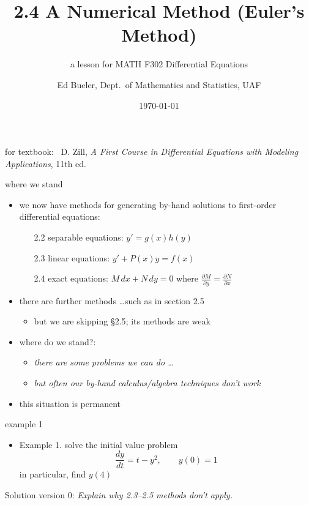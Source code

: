 \documentclass{beamer}
\title{2.4 A Numerical Method (Euler's Method)}
\subtitle{a lesson for MATH F302 Differential Equations}
\author{Ed Bueler, Dept.~of Mathematics and Statistics, UAF}
\date{\tiny \today}
\begin{document}

\begin{frame}
\titlepage

\centerline{\tiny for textbook: \, D. Zill, \emph{A First Course in Differential Equations with Modeling Applications}, 11th ed.}
\end{frame}



\begin{frame}{where we stand}

\begin{itemize}
\item we now have methods for generating by-hand solutions to first-order differential equations:
    \begin{itemize}
    \item[2.2] separable equations: $y'=g(x)h(y)$
    \item[2.3] linear equations: $y'+P(x)y=f(x)$
    \item[2.4] exact equations: $M\,dx + N\,dy=0$ where $\frac{\partial M}{\partial y} = \frac{\partial N}{\partial x}$
    \end{itemize}
\item there are further methods \dots such as in section 2.5
    \begin{itemize}
    \item but \alert{we are skipping \S 2.5}; its methods are weak
    \end{itemize}

\bigskip
\item where do we stand?:
    \begin{itemize}
    \item \emph{there are some problems we can do \dots}
    \item \emph{but often our by-hand calculus/algebra techniques \alert{don't} work}
    \end{itemize}
\item this situation is permanent
\end{itemize}
\end{frame}


\begin{frame}{example 1}

\begin{itemize}
\item Example 1.  solve the initial value problem
    $$\frac{dy}{dt} = t-y^2, \qquad y(0)=1$$
in particular, find $y(4)$
\end{itemize}

\medskip
Solution version 0: \emph{Explain why 2.3--2.5 methods don't apply.}

\vspace{50mm}
\end{frame}
\end{document}
